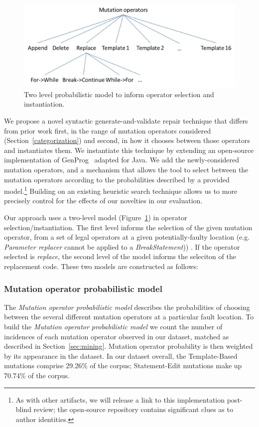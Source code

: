 \documentclass[conference]{IEEEtran}
\begin{document}
\begin{figure}[!h]
 \centering
    \includegraphics[width=\columnwidth]{Picture2}
  \caption{Two level probabilistic model to inform operator selection and instantiation. \label{fig:probModel}}
\end{figure}

We propose a novel syntactic generate-and-validate repair
technique that differs
from prior work first, in the range of mutation operators considered
(Section~\ref{categorization}) and second, in how it chooses between those
operators and instantiates them.  
We instantiate this technique by extending an open-source implementation of
GenProg~\cite{legoues12} adapted for Java.  We add the newly-considered mutation
operators, and a mechanism that allows the tool to
select between the mutation operators according to the probabilities described by
a provided model.\footnote{As with other artifacts, we will release a link to
  this implementation post-blind review; the open-source repository contains
  significant clues as to author identities.}
Building on an existing heuristic search technique allows us to more precisely
control for the effects of our novelties in our evaluation.  

Our approach uses a two-level model (Figure~\ref{fig:probModel}) in operator
selection/instantiation.  The first level informs the selection of the given
mutation operator, from a set of legal operators at a given potentially-faulty
location (e.g. \emph{Parameter replacer} cannot be applied to a \emph{BreakStatement})) .  If the operator selected is \emph{replace}, the second level of the
model informs the seleciton of the replacement code.  These two models are
constructed as follows: 

\subsubsection{Mutation operator probabilistic model}
The \textit{Mutation operator probabilistic model} 
describes the probabilities of choosing between the several different mutation 
operators at a particular fault location.
%
To build the \textit{Mutation operator probabilistic model} 
we count the number of incidences of each mutation operator observed in our
dataset, matched as described in Section~\ref{sec:mining}. Mutation operator probability is then
weighted by its appearance in the dataset.  
%
In our dataset overall, the Template-Based mutations comprise 29.26\% of the corpus; Statement-Edit mutations make up 70.74\% of the 
corpus.
\end{document}

